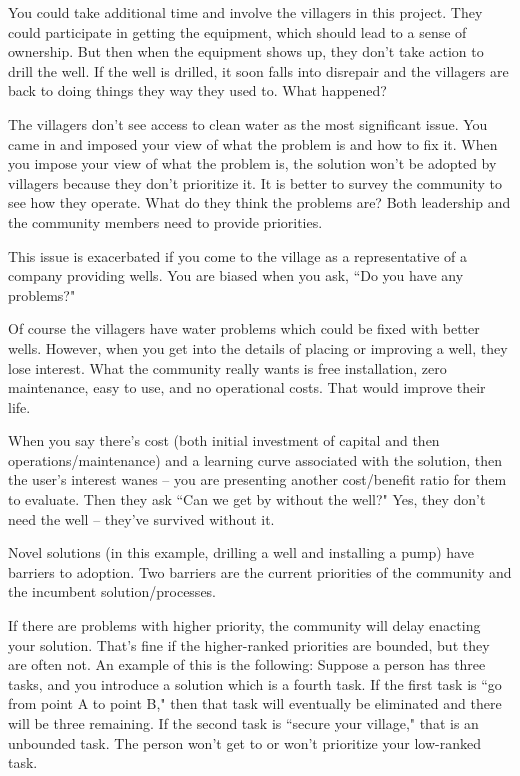 You could take additional time and involve the villagers in this project. They could participate in getting the equipment, which should lead to a sense of ownership.
But then when the equipment shows up, they don't take action to drill the well. If the well is drilled, it soon falls into disrepair and the villagers are back to doing things they way they used to. What happened?

The villagers don't see access to clean water as the most significant issue. You came in and imposed your view of what the problem is and how to fix it. When you impose your view of what the problem is, the solution won't be adopted by villagers because they don't prioritize it.
It is better to survey the community to see how they operate. What do they think the problems are?
Both leadership and the community members need to provide priorities.

This issue is exacerbated if you come to the village as a representative of a company providing wells. You are biased when you ask, ``Do you have any problems?"

Of course the villagers have water problems which could be fixed with better wells. However, when you get into the details of placing or improving a well, they lose interest. What the community really wants is free installation, zero maintenance, easy to use, and no operational costs. That would improve their life.

When you say there's cost (both initial investment of capital and then operations/maintenance) and a learning curve associated with the solution, then the user's interest wanes -- you are presenting another cost/benefit ratio for them to evaluate. Then they ask ``Can we get by without the well?" Yes, they don't need the well -- they've survived without it.

Novel solutions (in this example, drilling a well and installing a pump) have barriers to adoption. Two barriers are the current priorities of the community and the incumbent solution/processes.

If there are problems with higher priority, the community will delay enacting your solution. That's fine if the higher-ranked priorities are bounded, but they are often not. An example of this is the following:
Suppose a person has three tasks, and you introduce a solution which is a fourth task.
If the first task is ``go from point A to point B," then that task will eventually be eliminated and there will be three remaining.
If the second task is ``secure your village," that is an unbounded task. The person won't get to or won't prioritize your low-ranked task.

